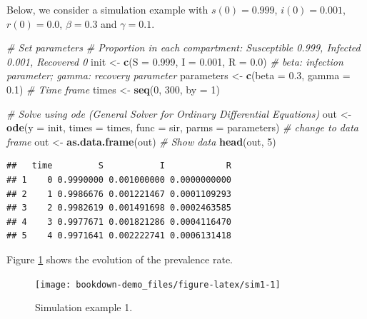 \documentclass[]{book}
\newenvironment{Shaded}{\begin{snugshade}}{\end{snugshade}}
\newcommand{\KeywordTok}[1]{\textcolor[rgb]{0.13,0.29,0.53}{\textbf{#1}}}
\newcommand{\DataTypeTok}[1]{\textcolor[rgb]{0.13,0.29,0.53}{#1}}
\newcommand{\DecValTok}[1]{\textcolor[rgb]{0.00,0.00,0.81}{#1}}
\newcommand{\FloatTok}[1]{\textcolor[rgb]{0.00,0.00,0.81}{#1}}
\newcommand{\StringTok}[1]{\textcolor[rgb]{0.31,0.60,0.02}{#1}}
\newcommand{\CommentTok}[1]{\textcolor[rgb]{0.56,0.35,0.01}{\textit{#1}}}
\newcommand{\NormalTok}[1]{#1}
\begin{document}
Below, we consider a simulation example with \(s(0)=0.999\),
\(i(0)=0.001\), \(r(0)=0.0\), \(\beta=0.3\) and \(\gamma=0.1\).

\begin{Shaded}
\begin{Highlighting}[]
\CommentTok{# Set parameters}
\CommentTok{# Proportion in each compartment: Susceptible 0.999, Infected 0.001, Recovered 0}
\NormalTok{init <-}\StringTok{ }\KeywordTok{c}\NormalTok{(}\DataTypeTok{S =} \FloatTok{0.999}\NormalTok{, }\DataTypeTok{I =} \FloatTok{0.001}\NormalTok{, }\DataTypeTok{R =} \FloatTok{0.0}\NormalTok{)}
\CommentTok{# beta: infection parameter; gamma: recovery parameter}
\NormalTok{parameters <-}\StringTok{ }\KeywordTok{c}\NormalTok{(}\DataTypeTok{beta =} \FloatTok{0.3}\NormalTok{, }\DataTypeTok{gamma =} \FloatTok{0.1}\NormalTok{)}
\CommentTok{# Time frame}
\NormalTok{times <-}\StringTok{ }\KeywordTok{seq}\NormalTok{(}\DecValTok{0}\NormalTok{, }\DecValTok{300}\NormalTok{, }\DataTypeTok{by =} \DecValTok{1}\NormalTok{)}

\CommentTok{# Solve using ode (General Solver for Ordinary Differential Equations)}
\NormalTok{out <-}\StringTok{ }\KeywordTok{ode}\NormalTok{(}\DataTypeTok{y =}\NormalTok{ init, }\DataTypeTok{times =}\NormalTok{ times, }\DataTypeTok{func =}\NormalTok{ sir, }\DataTypeTok{parms =}\NormalTok{ parameters)}
\CommentTok{# change to data frame}
\NormalTok{out <-}\StringTok{ }\KeywordTok{as.data.frame}\NormalTok{(out)}
\CommentTok{# Show data}
\KeywordTok{head}\NormalTok{(out, }\DecValTok{5}\NormalTok{)}
\end{Highlighting}
\end{Shaded}

\begin{verbatim}
##   time         S           I            R
## 1    0 0.9990000 0.001000000 0.0000000000
## 2    1 0.9986676 0.001221467 0.0001109293
## 3    2 0.9982619 0.001491698 0.0002463585
## 4    3 0.9977671 0.001821286 0.0004116470
## 5    4 0.9971641 0.002222741 0.0006131418
\end{verbatim}

Figure \ref{fig:sim1} shows the evolution of the prevalence rate.

\begin{figure}

{\centering \texttt{[image: bookdown-demo\_files/figure-latex/sim1-1]} 

}

\caption{Simulation example 1.}\label{fig:sim1}
\end{figure}
\end{document}
